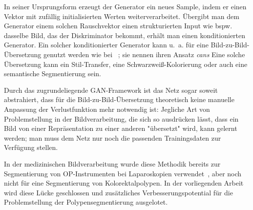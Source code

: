 In seiner Ursprungsform erzeugt der Generator ein neues Sample, indem er einen Vektor mit zufällig initialisierten Werten weiterverarbeitet.
Übergibt man dem Generator einem solchen Rauschvektor einen strukturierten Input wie bspw. dasselbe Bild, das der Diskriminator bekommt, erhält man einen konditionierten Generator.
Ein solcher konditionierter Generator kann u.~a. für eine Bild-zu-Bild-Übersetzung genutzt werden wie bei \citeauthor{Isola.2017}~\cite{Isola.2017}; sie nennen ihren Ansatz \emph{\glspl{can}}
Eine solche Übersetzung kann ein Stil-Transfer, eine Schwarzweiß-Kolorierung oder auch eine semantische Segmentierung sein.

Durch das zugrundeliegende GAN-Framework ist das Netz sogar soweit abstrahiert, dass für die Bild-zu-Bild-Übersetzung theoretisch keine manuelle Anpassung der Verlustfunktion mehr notwendig ist:
Jegliche Art von Problemstellung in der Bildverarbeitung, die sich so ausdrücken lässt, dass ein Bild von einer Repräsentation zu einer anderen "übersetzt" wird, kann gelernt werden; man muss dem Netz nur noch die passenden Trainingsdaten zur Verfügung stellen.

In der medizinischen Bildverarbeitung wurde diese Methodik bereits zur Segmentierung von OP-Instrumenten bei Laparoskopien verwendet~\cite{Zisimopoulos.2017}, aber noch nicht für eine Segmentierung von Kolorektalpolypen.
In der vorliegenden Arbeit wird diese Lücke geschlossen und zusätzliches Verbesserungspotential für die Problemstellung der Polypensegmentierung ausgelotet.
